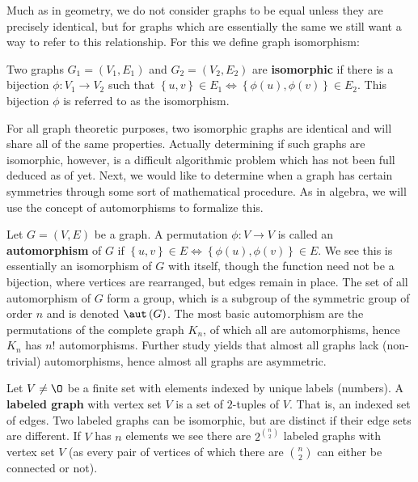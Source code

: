 Much as in geometry, we do not consider graphs to be equal unless they are precisely identical, but for graphs which are essentially the same we still want a way to refer to this relationship. For this we define graph isomorphism:
\begin{definition}
	Two graphs $G_1 = \left( V_1, E_1 \right) $ and $G_2 = \left( V_2, E_2 \right) $ are \textbf{isomorphic} if there is a bijection $\phi : V_1 \to V_2$ such that $\left\{ u,v \right\} \in E_1 \iff \left\{ \phi \left( u \right) , \phi \left( v \right)  \right\} \in E_2$. This bijection $\phi$ is referred to as the isomorphism.
\end{definition}
For all graph theoretic purposes, two isomorphic graphs are identical and will share all of the same properties. Actually determining if such graphs are isomorphic, however, is a difficult algorithmic problem which has not been full deduced as of yet. Next, we would like to determine when a graph has certain symmetries through some sort of mathematical procedure. As in algebra, we will use the concept of automorphisms to formalize this.
\begin{definition}
	Let  $G = \left( V, E \right) $ be a graph. A permutation $\phi: V \to V$ is called an \textbf{automorphism} of $G$ if $\left\{ u,v \right\}  \in E \iff \left\{ \phi \left( u \right) , \phi \left( v \right)  \right\}  \in E$. We see this is essentially an isomorphism of $G$ with itself, though the function need not be a bijection, where vertices are rearranged, but edges remain in place. The set of all automorphism of $G$ form a group, which is a subgroup of the symmetric group of order $n$ and is denoted $\aut\left( G \right) $.
	The most basic automorphism are the permutations of the complete graph $K_{n}$, of which all are automorphisms, hence $K_{n}$ has $n!$ automorphisms. Further study yields that almost all graphs lack (non-trivial) automorphisms, hence almost all graphs are asymmetric.

\end{definition}
\begin{definition}
	Let $V \neq \O$ be a finite set with elements indexed by unique labels (numbers). A \textbf{labeled graph} with vertex set $V$ is a set of $2$-tuples of $V$. That is, an indexed set of edges. Two labeled graphs can be isomorphic, but are distinct if their edge sets are different. If $V$ has $n$ elements we see there are $2^{\binom{n}{2}}$ labeled graphs with vertex set $V$ (as every pair of vertices of which there are $\binom{n}{2}$ can either be connected or not).
\end{definition}
